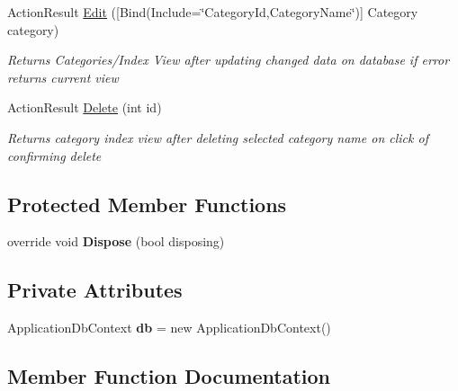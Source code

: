 \begin{DoxyCompactItemize}
Action\+Result \hyperlink{class_alfa_accounting_1_1_controllers_1_1_categories_controller_a142fd9f355a35281c7ad9ff87ab918a0}{Edit} (\mbox{[}Bind(Include=\char`\"{}Category\+Id,Category\+Name\char`\"{})\mbox{]} Category category)
\begin{DoxyCompactList}\small\item\em Returns Categories/\+Index View after updating changed data on database if error returns current view \end{DoxyCompactList}\item 
Action\+Result \hyperlink{class_alfa_accounting_1_1_controllers_1_1_categories_controller_a4b6eab9f8217e12a9355096d8428ecce}{Delete} (int id)
\begin{DoxyCompactList}\small\item\em Returns category index view after deleting selected category name on click of confirming delete \end{DoxyCompactList}\end{DoxyCompactItemize}
\subsection*{Protected Member Functions}
\begin{DoxyCompactItemize}
\item 
\mbox{\label{class_alfa_accounting_1_1_controllers_1_1_categories_controller_a1e0ca5fcea4ff7a470449b1ee2fd410e}} 
override void {\bfseries Dispose} (bool disposing)
\end{DoxyCompactItemize}
\subsection*{Private Attributes}
\begin{DoxyCompactItemize}
\item 
\mbox{\label{class_alfa_accounting_1_1_controllers_1_1_categories_controller_a829492a2dbc101473ea8ebf9d9450788}} 
Application\+Db\+Context {\bfseries db} = new Application\+Db\+Context()
\end{DoxyCompactItemize}


\subsection{Member Function Documentation}
\mbox{\label{class_alfa_accounting_1_1_controllers_1_1_categories_controller_afb5aa7304afa4262b327cfd80412ee32}} 
